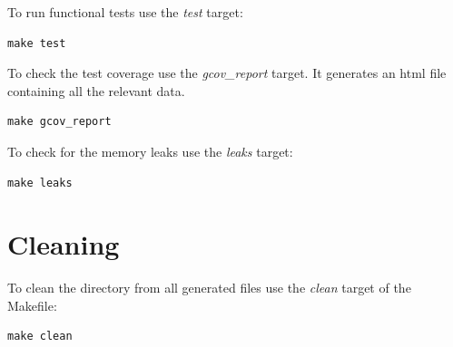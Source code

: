 \documentclass[a4paper, 12pt]{article}
\begin{document}
To run functional tests use the \textit{test} target:
\begin{verbatim}
make test
\end{verbatim}

To check the test coverage use the \textit{gcov\_report} target. It generates an html file containing all the relevant data.
\begin{verbatim}
make gcov_report
\end{verbatim}

To check for the memory leaks use the \textit{leaks} target:
\begin{verbatim}
make leaks
\end{verbatim}

\section{Cleaning}
To clean the directory from all generated files use the \textit{clean} target of the Makefile:
\begin{verbatim}
make clean
\end{verbatim}
\end{document}
